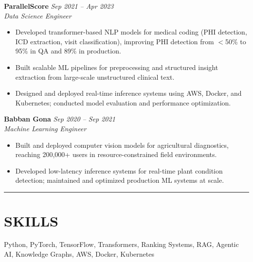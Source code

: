 \documentclass[10pt]{article}
\begin{document}
\vspace{2pt}
\noindent\textbf{ParallelScore} \hfill \textit{Sep 2021 -- Apr 2023} \\
\textit{Data Science Engineer}
\begin{itemize}
  \item Developed transformer-based NLP models for medical coding (PHI detection, ICD extraction, visit classification), improving PHI detection from $<$50\% to 95\% in QA and 89\% in production.
  \item Built scalable ML pipelines for preprocessing and structured insight extraction from large-scale unstructured clinical text.
  \item Designed and deployed real-time inference systems using AWS, Docker, and Kubernetes; conducted model evaluation and performance optimization.
\end{itemize}

\vspace{2pt}
\noindent\textbf{Babban Gona} \hfill \textit{Sep 2020 -- Sep 2021} \\
\textit{Machine Learning Engineer}
\begin{itemize}
  \item Built and deployed computer vision models for agricultural diagnostics, reaching 200,000+ users in resource-constrained field environments.
  \item Developed low-latency inference systems for real-time plant condition detection; maintained and optimized production ML systems at scale.
\end{itemize}

\vspace{2pt}
\noindent\rule{\linewidth}{0.4pt}
\vspace{-6pt}

\section*{\small SKILLS}
\vspace{-4pt}
\noindent Python, PyTorch, TensorFlow, Transformers, Ranking Systems, RAG, Agentic AI, Knowledge Graphs, AWS, Docker, Kubernetes
\end{document}
